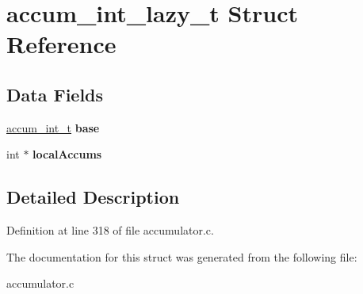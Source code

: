 \hypertarget{structaccum__int__lazy__t}{\section{accum\-\_\-int\-\_\-lazy\-\_\-t Struct Reference}
\label{structaccum__int__lazy__t}
}
\subsection*{Data Fields}
\begin{DoxyCompactItemize}
\item 
\hypertarget{structaccum__int__lazy__t_add3e0b1914aa738d0ef0b1dcdc036463}{\hyperlink{structaccum__int__t}{accum\-\_\-int\-\_\-t} {\bfseries base}}\label{structaccum__int__lazy__t_add3e0b1914aa738d0ef0b1dcdc036463}

\item 
\hypertarget{structaccum__int__lazy__t_a52a6435718ed8d5e24ed3e0a54d0400d}{int $\ast$ {\bfseries local\-Accums}}\label{structaccum__int__lazy__t_a52a6435718ed8d5e24ed3e0a54d0400d}

\end{DoxyCompactItemize}


\subsection{Detailed Description}


Definition at line 318 of file accumulator.\-c.



The documentation for this struct was generated from the following file\-:\begin{DoxyCompactItemize}
\item 
accumulator.\-c\end{DoxyCompactItemize}
